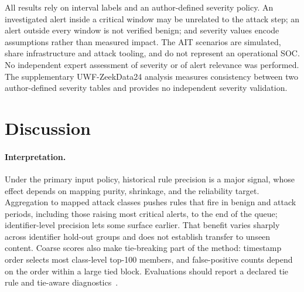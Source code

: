 \documentclass[pdflatex,sn-basic,Numbered]{sn-jnl}
\newcommand{\key}{\textsubscript{key}}
\begin{document}
\begin{tableorg}[t]
\centering
\caption{Identifier hold-out support and S1\key{} outcomes. Alerts and critical records are summed across scenarios. Eligible intervals contain at least one record from the withheld group. Subgroup covered counts only selected top-100 records from that group; whole coverage includes all identifiers.}
\label{tab:holdout-support}
\small
\unskip
\end{tableorg}

\begin{tableorg}[t]
\centering
\caption{Replay on five forward-eligible scenarios (20 critical intervals); cells are LOSO / forward fitting. Both designs start 7,477 investigations per ranker at 12/h; forward fitting excludes later scenarios. Before end counts first starts before the exclusive interval end. The residual start category is noncritical interval-positive; Online Resource~1, Section~S9 gives the complete partition.}
\label{tab:forward-replay}
\small
\unskip
\end{tableorg}



All results rely on interval labels and an author-defined severity policy. An investigated alert inside a critical window may be unrelated to the attack step; an alert outside every window is not verified benign; and severity values encode assumptions rather than measured impact. The AIT scenarios are simulated, share infrastructure and attack tooling, and do not represent an operational SOC. No independent expert assessment of severity or of alert relevance was performed. The supplementary UWF-ZeekData24 analysis measures consistency between two author-defined severity tables and provides no independent severity validation.



\section{Discussion}
\label{sec:discussion}

\paragraph{Interpretation.} Under the primary input policy, historical rule precision is a major signal, whose effect depends on mapping purity, shrinkage, and the reliability target. Aggregation to mapped attack classes pushes rules that fire in benign and attack periods, including those raising most critical alerts, to the end of the queue; identifier-level precision lets some surface earlier. That benefit varies sharply across identifier hold-out groups and does not establish transfer to unseen content. Coarse scores also make tie-breaking part of the method: timestamp order selects most class-level top-100 members, and false-positive counts depend on the order within a large tied block. Evaluations should report a declared tie rule and tie-aware diagnostics~\citep{McSherryNajork2008TiedScores}.
\end{document}
